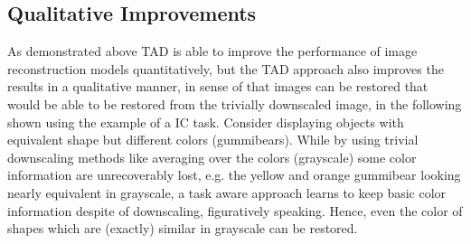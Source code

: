\subsection{Qualitative Improvements}
\label{sec:Experiments_QI}
As demonstrated above \ac{TAD} is able to improve the performance of
image reconstruction models quantitatively, but the \ac{TAD} approach also
improves the results in a qualitative manner, in sense of that images can be
restored that would be able to be restored from the trivially downscaled image,
in the following shown using the example of a \ac{IC} task.
\newline
Consider  displaying objects with equivalent shape
but different colors (gummibears). While by using trivial downscaling methods
like averaging over the colors (grayscale) some color information are
unrecoverably lost, e.g. the yellow and orange gummibear looking nearly
equivalent in grayscale, a task aware approach learns to keep basic color
information despite of downscaling, figuratively speaking. Hence, even the color
of shapes which are (exactly) similar in grayscale can be restored.


